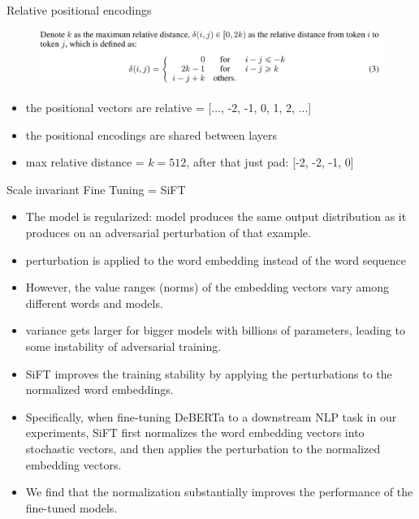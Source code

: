 \documentclass{beamer}
\begin{document}
\begin{frame}{Relative positional encodings}
 
\begin{figure}[h]
\includegraphics[width=\textwidth]{img/reldist}
\end{figure}

\begin{itemize}
\item the positional vectors are relative = [..., -2, -1, 0, 1, 2, ...]
\item the positional encodings are shared between layers
\item max relative distance = $k=512$, after that just pad: [-2, -2, -1, 0]
\end{itemize}

\end{frame}
\begin{frame}{Scale invariant Fine Tuning = SiFT}

\begin{itemize}
\item The model is regularized: model produces the same output distribution as it produces on an adversarial perturbation of that example.
\item perturbation is applied to the word embedding instead of the word sequence
\item However, the value ranges (norms) of the embedding vectors vary among different words and models.
\item variance gets larger for bigger models with billions of parameters, leading to some instability of adversarial training.
\item SiFT improves the training stability by applying the perturbations to the normalized word embeddings.
\item Specifically, when fine-tuning DeBERTa to a downstream NLP task in our experiments, SiFT first normalizes the word embedding vectors into stochastic vectors, and then applies the perturbation to the normalized embedding vectors. 
\item We find that the normalization substantially improves the performance of the fine-tuned models.
\end{itemize}


\end{frame}
\end{document}
